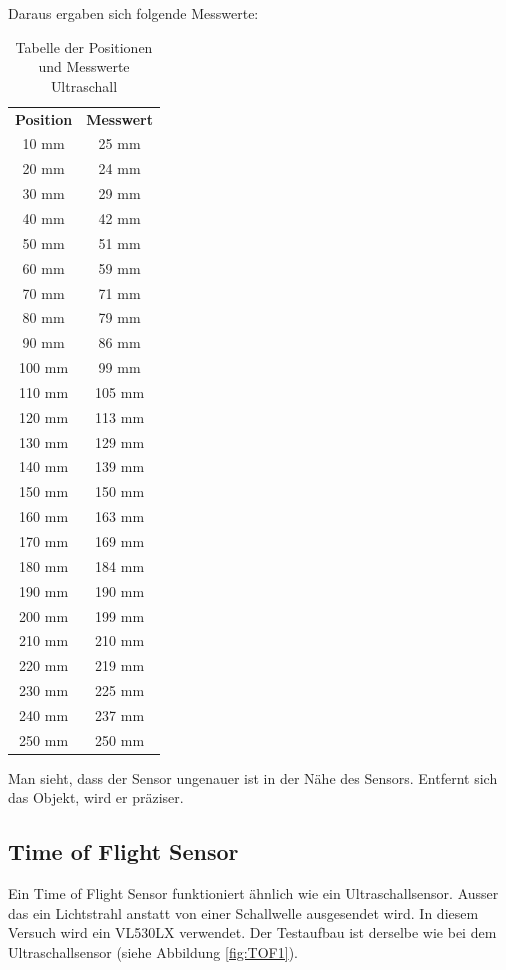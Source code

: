 Daraus ergaben sich folgende Messwerte:
\begin{table}[H]
    \centering
    \begin{tabular}{cc} %
        \textbf{Position} & \textbf{Messwert} \\ %
        10 mm  & 25 mm  \\
        20 mm  & 24 mm  \\
        30 mm  & 29 mm  \\
        40 mm  & 42 mm  \\
        50 mm  & 51 mm  \\
        60 mm  & 59 mm  \\
        70 mm  & 71 mm  \\
        80 mm  & 79 mm  \\
        90 mm  & 86 mm  \\
        100 mm & 99 mm  \\
        110 mm & 105 mm \\
        120 mm & 113 mm \\
        130 mm & 129 mm \\
        140 mm & 139 mm \\
        150 mm & 150 mm \\
        160 mm & 163 mm \\
        170 mm & 169 mm \\
        180 mm & 184 mm \\
        190 mm & 190 mm \\
        200 mm & 199 mm \\
        210 mm & 210 mm \\
        220 mm & 219 mm \\
        230 mm & 225 mm \\
        240 mm & 237 mm \\
        250 mm & 250 mm \\
    \end{tabular}
    \caption{Tabelle der Positionen und Messwerte Ultraschall}
    \label{tab:messwerte}
\end{table}

Man sieht, dass der Sensor ungenauer ist in der Nähe des Sensors. Entfernt sich das Objekt, wird er präziser.

\newpage

\subsection{Time of Flight Sensor}
Ein Time of Flight Sensor funktioniert ähnlich wie ein Ultraschallsensor. Ausser das ein Lichtstrahl anstatt von einer Schallwelle ausgesendet wird. In diesem Versuch wird ein VL530LX verwendet. Der Testaufbau ist derselbe wie bei dem Ultraschallsensor (siehe Abbildung \ref{fig:TOF1}).

